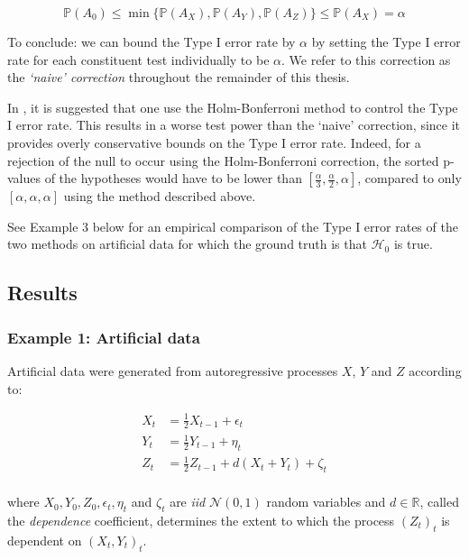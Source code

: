 \documentclass[12pt]{article}
\numberwithin{claim}{section}
\numberwithin{lemma}{section}
\numberwithin{theorem}{section}
\begin{document}
\[ \mathbb{P}(A_0)  \leq \min\{\mathbb{P}(A_X),\mathbb{P}(A_Y), \mathbb{P}(A_Z) \} \leq \mathbb{P}(A_X) = \alpha \]

To conclude: we can bound the Type I error rate by $\alpha$ by setting the Type I error rate for each constituent test individually to be $\alpha$. We refer to this correction as the \emph{`naive' correction} throughout the remainder of this thesis.

In \cite{sejdinovic2013kernel}, it is suggested that one use the Holm-Bonferroni method to control the Type I error rate. This results in a worse test power than the `naive' correction, since it provides overly conservative bounds on the Type I error rate. Indeed, for a rejection of the null to occur using the Holm-Bonferroni correction, the sorted p-values of the hypotheses would have to be lower than $[\frac{\alpha}{3}, \frac{\alpha}{2}, \alpha]$, compared to only $[\alpha, \alpha, \alpha]$ using the method described above.

See Example 3 below for an empirical comparison of the Type I error rates of the two methods on artificial data for which the ground truth is that $\mathcal{H}_0$ is true.

\subsection{Results}


\subsubsection{Example 1: Artificial data}
Artificial data were generated from autoregressive processes $X$, $Y$ and $Z$ according to:

\begin{align*}
X_t &= \frac{1}{2}X_{t-1} + \epsilon_t\\
Y_t &= \frac{1}{2}Y_{t-1} + \eta_t\\
Z_t &= \frac{1}{2}Z_{t-1} + d(X_t + Y_t) + \zeta_t\\
\end{align*}

where $X_0, Y_0, Z_0, \epsilon_t, \eta_t$ and $\zeta_t$ are \emph{iid} $\mathcal{N}(0,1)$ random variables and $d\in\mathbb{R}$, called the \emph{dependence} coefficient, determines the extent to which the process $(Z_t)_t$ is dependent on $(X_t,Y_t)_t$.
\end{document}
